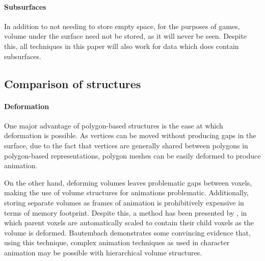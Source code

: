 \paragraph{Subsurfaces}
In addition to not needing to store empty space, for the purposes of games, volume under the surface need not be stored, as it will never be seen. Despite this, all techniques in this paper will also work for data which does contain subsurfaces.

\subsection{Comparison of structures}

\paragraph{Deformation}
One major advantage of polygon-based structures is the ease at which deformation is possible. As vertices can be moved without producing gaps in the surface, due to the fact that vertices are generally shared between polygons in polygon-based representations, polygon meshes can be easily deformed to produce animation.

On the other hand, deforming volumes leaves problematic gaps between voxels, making the use of volume structures for animations problematic. Additionally, storing separate volumes as frames of animation is prohibitively expensive in terms of memory footprint. Despite this, a method has been presented by \cite{bautembach2011animated}, in which parent voxels are automatically scaled to contain their child voxels as the volume is deformed. Bautembach demonstrates some convincing evidence that, using this technique, complex animation techniques as used in character animation may be possible with hierarchical volume structures.